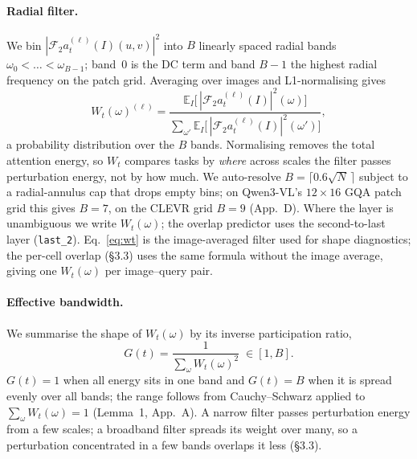 \paragraph{Radial filter.}
We bin $|\mathcal{F}_2 a^{(\ell)}_t(I)(u,v)|^2$ into $B$ linearly spaced
radial bands $\omega_0<\dots<\omega_{B-1}$; band~0 is the DC term and
band $B-1$ the highest radial frequency on the patch grid. Averaging
over images and L1-normalising gives
\begin{equation}
  W_t(\omega)^{(\ell)} =
  \frac{\mathbb{E}_I\big[\,|\mathcal{F}_2 a^{(\ell)}_t(I)|^2(\omega)\big]}
       {\sum_{\omega'}\mathbb{E}_I\big[\,|\mathcal{F}_2 a^{(\ell)}_t(I)|^2(\omega')\big]},
  \label{eq:wt}
\end{equation}
a probability distribution over the $B$ bands. Normalising removes the
total attention energy, so $W_t$ compares tasks by \emph{where} across
scales the filter passes perturbation energy, not by how much. We
auto-resolve $B=\lceil 0.6\sqrt{N}\,\rceil$ subject to a radial-annulus
cap that drops empty bins; on Qwen3-VL's $12\times16$ GQA patch grid this
gives $B=7$, on the CLEVR grid $B=9$ (App.~D). Where the layer is
unambiguous we write $W_t(\omega)$; the overlap predictor uses the
second-to-last layer (\texttt{last\_2}). Eq.~\eqref{eq:wt} is the
image-averaged filter used for shape diagnostics; the per-cell overlap
(\S3.3) uses the same formula without the image average, giving one
$W_t(\omega)$ per image--query pair.

\paragraph{Effective bandwidth.}
We summarise the shape of $W_t(\omega)$ by its inverse participation
ratio,
\begin{equation}
  G(t)=\frac{1}{\sum_\omega W_t(\omega)^2}\;\in[1,B].
  \label{eq:ipr}
\end{equation}
$G(t)=1$ when all energy sits in one band and $G(t)=B$ when it is spread
evenly over all bands; the range follows from Cauchy--Schwarz applied to
$\sum_\omega W_t(\omega)=1$ (Lemma~1, App.~A). A narrow filter passes
perturbation energy from a few scales; a broadband filter spreads its
weight over many, so a perturbation concentrated in a few bands overlaps
it less (\S3.3).


